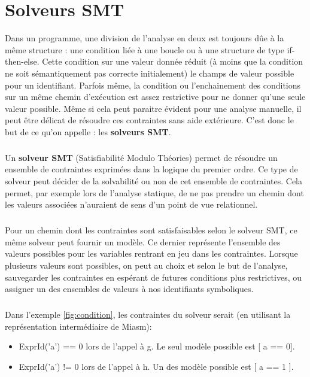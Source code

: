 \section{Solveurs SMT}
Dans un programme, une division de l'analyse en deux est toujours dûe à la même structure : une condition liée à une boucle ou à une structure de type if-then-else.
Cette condition sur une valeur donnée réduit (à moins que la condition ne soit sémantiquement pas correcte initialement) le champs de valeur possible pour un identifiant.
Parfois même, la condition ou l'enchainement des conditions sur un même chemin d'exécution est assez restrictive pour ne donner qu'une seule valeur possible.
Même si cela peut paraitre évident pour une analyse manuelle, il peut être délicat de résoudre ces contraintes sans aide extérieure. C'est donc le but de ce qu'on appelle : les \textbf{solveurs SMT}.
\subparagraph{}
Un \textbf{solveur SMT} (Satisfiabilité Modulo Théories) permet de résoudre un ensemble de contraintes exprimées dans la logique du premier ordre. Ce type de solveur peut décider
de la solvabilité ou non de cet ensemble de contraintes. Cela permet, par exemple lors de l'analyse statique, de ne pas prendre un chemin dont les valeurs associées n'auraient
de sens d'un point de vue relationnel.
\subparagraph{}
Pour un chemin dont les contraintes sont satisfaisables selon le solveur SMT, ce même solveur peut fournir un modèle. Ce dernier représente l'ensemble des valeurs possibles
pour les variables rentrant en jeu dans les contraintes. Lorsque plusieurs valeurs sont possibles, on peut au choix et selon le but de l'analyse, sauvegarder les contraintes
en espérant de futures conditions plus restrictives, ou assigner un des ensembles de valeurs à nos identifiants symboliques.
\subparagraph{}
Dans l'exemple \ref{fig:condition}, les contraintes du solveur serait (en utilisant la représentation intermédiaire de Miasm):
\begin{itemize}
    \item ExprId('a') == 0 lors de l'appel à g. Le seul modèle possible est [ a == 0].
    \item ExprId('a') != 0 lors de l'appel à h. Un des modèle possible est [ a == 1 ].
\end{itemize}



